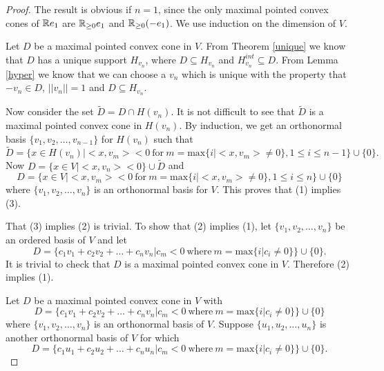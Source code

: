 \documentclass[psamsfonts]{amsart}
\numberwithin{equation}{subsection}
\theoremstyle{plain}
\theoremstyle{definition}
\theoremstyle{remark}
\begin{document}
\begin{proof}  The result is obvious if $n = 1$, since the only maximal pointed convex cones of $\Bbb{R}e_1$ are 
$\Bbb{R}_{\geq 0}e_1$ and $\Bbb{R}_{\geq 0}(-e_1)$. We use induction on the dimension of $V$. 

Let $D$ be   a maximal pointed convex cone   in $V$. From Theorem \ref{unique}  we know that  $D$   has a unique  support $H_{v_{n }}$, where 
$D \subseteq H_{v_{n }}$ and $H_{v_n}^{int}  \subseteq D$. From Lemma \ref{hyper} we know that we can choose a $v_n$ which is  unique with the property that 
  $-v_n \in D$,    $||v_n|| = 1$ and  $D \subseteq H_{v_{n }}$. 


Now consider the set $\widetilde{D} = D \cap H(v_{n })$. It is not difficult to see that $\widetilde{D}$ is a maximal pointed convex cone in 
$H(v_{n })$.   By induction, we get an orthonormal  basis $\{v_1, v_2, \dots , v_{n - 1 }\}$ for $H(v_{n })$ such that  
$$\widetilde{D} =  \{x \in H(v_{n }) | <x, v_m> < 0 \ \mbox{for} \ m = \mbox{max}\{i | <x, v_m> \not= 0\}, 1\leq i \leq n -1 \} \cup \{0\}.$$
Now   $D = \{x \in V | <x, v_{n }>  < 0\} \cup \widetilde{D}$ and  
$$D =   \{x \in V | <x, v_m> < 0 \ \mbox{for} \ m = \mbox{max}\{i | <x, v_m> \not= 0\} , 1\leq i \leq n \} \cup \{0\}$$
where  $\{v_1, v_2, \dots , v_n\}$ is an orthonormal basis for $V$. 
This proves that (1) implies (3). 

That (3) implies (2) is trivial.  To show that (2) implies (1), let $\{v_1, v_2, \dots , v_n \}$ be an ordered basis of $V$ and let  $$D = \{c_1v_1 + c_2v_2 + \dots + c_nv_n | c_m < 0 \ \mbox{where} \ m = \mbox{max}\{i | 
c_i \not= 0 \} \}  \cup \{0\}.$$ 
It is trivial to check that $D$ is a maximal pointed convex cone in $V$. Therefore (2) implies (1). 

Let $D$ be a maximal pointed convex cone in $V$ with 
$$D = \{c_1v_1 + c_2v_2 + \dots + c_nv_n | c_m < 0 \ \mbox{where} \ m = \mbox{max}\{i | 
c_i \not= 0 \} \}  \cup \{0\} $$
where $\{v_1, v_2, \dots , v_n\}$ is an orthonormal basis of $V$. 
Suppose $\{u_1, u_2, \dots , u_n\}$ is another orthonormal basis of $V$ for which 
$$D = \{c_1u_1 + c_2u_2 + \dots + c_nu_n | c_m < 0 \ \mbox{where} \ m = \mbox{max}\{i | 
c_i \not= 0 \} \}  \cup \{0\}. $$


\end{proof}
\end{document}
